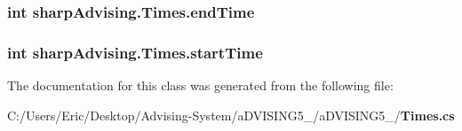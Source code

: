 \subsubsection[{end\+Time}]{\setlength{\rightskip}{0pt plus 5cm}int sharp\+Advising.\+Times.\+end\+Time}\label{classsharp_advising_1_1_times_adfa1d91738c732f50b85bce0cddd3124}
\subsubsection[{start\+Time}]{\setlength{\rightskip}{0pt plus 5cm}int sharp\+Advising.\+Times.\+start\+Time}\label{classsharp_advising_1_1_times_ab18252018ca3dfc811f02adf425a922c}


The documentation for this class was generated from the following file\+:\begin{DoxyCompactItemize}
\item 
C\+:/\+Users/\+Eric/\+Desktop/\+Advising-\/\+System/a\+D\+V\+I\+S\+I\+N\+G5\+\_/a\+D\+V\+I\+S\+I\+N\+G5\+\_/{\bf Times.\+cs}\end{DoxyCompactItemize}
